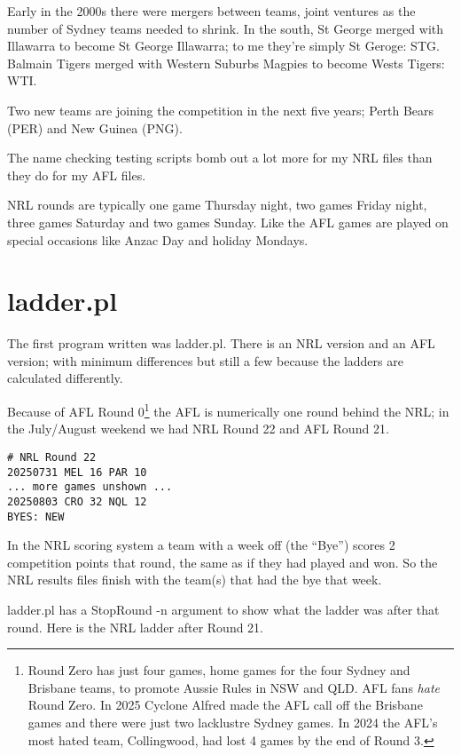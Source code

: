 \documentclass{article}      %
\begin{document}
Early in the 2000s there were mergers between teams, joint ventures as
the number of Sydney teams needed to shrink. In the south, St George
merged with Illawarra to become St George Illawarra; to me they're
simply St Geroge: STG. Balmain Tigers merged with Western Suburbs
Magpies to become Wests Tigers: WTI.

Two new teams are joining the competition in the next five years;
Perth Bears (PER) and New Guinea (PNG).

The name checking testing scripts bomb out a lot more for my NRL files
than they do for my AFL files.

NRL rounds are typically one game Thursday night, two games Friday
night, three games Saturday and two games Sunday. Like the AFL games
are played on special occasions like Anzac Day and holiday Mondays.

\section{ladder.pl}

The first program written was ladder.pl. There is an NRL version and
an AFL version; with minimum differences but still a few because the
ladders are calculated differently.

Because of AFL Round 0\footnote{Round Zero has just four games, home
games for the four Sydney and Brisbane teams, to promote
Aussie Rules in NSW and QLD.  AFL fans \emph{hate}
Round Zero. In 2025 Cyclone Alfred made the AFL call off the
Brisbane games and there were just two lacklustre Sydney games.
In 2024 the AFL's most hated team, Collingwood, had lost 4 games by
the end of Round 3.} the AFL is numerically one round behind the NRL;
in the July/August weekend we had NRL Round 22 and AFL Round 21.

\begin{verbatim}
# NRL Round 22
20250731 MEL 16 PAR 10
... more games unshown ...
20250803 CRO 32 NQL 12
BYES: NEW
\end{verbatim}

In the NRL scoring system a team with a week off (the ``Bye'') scores
2 competition points that round, the same as if they had played and
won. So the NRL results files finish with the team(s) that had the bye
that week.

ladder.pl has a StopRound -n argument to show what the ladder was
after that round. Here is the NRL ladder after Round 21.
\end{document}
